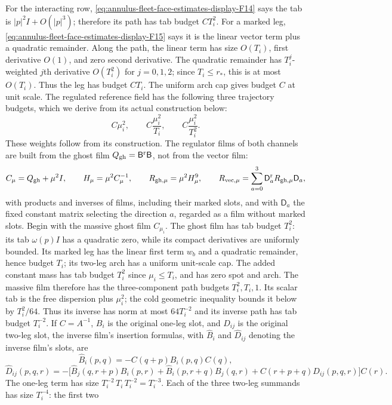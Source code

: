 For the interacting row, \eqref{eq:annulus-fleet-face-estimates-display-F14} says the tab is $|p|^2I+O(|p|^3)$;
therefore its path has tab budget $C T_i^2$. For a marked leg, \eqref{eq:annulus-fleet-face-estimates-display-F15}
says it is the linear vector term plus a quadratic remainder. Along the
path, the linear term has size $O(T_i)$, first derivative $O(1)$, and
zero second derivative. The quadratic remainder has
$T_i^j$-weighted $j$th derivative $O(T_i^2)$ for $j=0,1,2$; since
$T_i\leq r_*$, this is at most $O(T_i)$. Thus the leg has budget
$C T_i$. The
uniform arch cap gives budget $C$ at unit scale. The regulated reference
field has the following three trajectory budgets, which we derive from
its actual construction below:
\[
  C\mu_i^2,\qquad C\frac{\mu_i^2}{T_i},\qquad
  C\frac{\mu_i^2}{T_i^2}.
\]
These weights follow from its construction. The regulator films of
both channels are built from the ghost film
$Q_{\rm gh}=\mathsf B^{\rm r}\mathsf B$, not from the vector film:
\[
 C_\mu=Q_{\rm gh}+\mu^2I,\qquad
 H_\mu=\mu^2C_\mu^{-1},\qquad
 R_{{\rm gh},\mu}=\mu^2H_\mu^{9},\qquad
 R_{{\rm vec},\mu}=\sum_{a=0}^3\mathsf D_a^{\rm r}R_{{\rm gh},\mu}
                    \mathsf D_a,
\]
with products and inverses of films, including their marked slots, and
with $\mathsf D_a$ the fixed constant matrix selecting the direction
$a$, regarded as a film without marked slots. Begin with the massive
ghost film $C_{\mu_i}$. The ghost film has
tab budget $T_i^2$: its tab $\omega(p)I$ has a quadratic zero, while
its compact derivatives are uniformly bounded. Its marked leg has the
linear first term $w_b$ and a quadratic remainder, hence budget $T_i$;
its two-leg arch
has a uniform unit-scale cap. The added constant mass has tab budget
$T_i^2$ since $\mu_i\leq T_i$, and has zero spot and arch. The massive
film therefore has the three-component path budgets $T_i^2,T_i,1$. Its
scalar tab is the free
dispersion plus $\mu_i^2$; the cold geometric inequality bounds it below
by $T_i^2/64$. Thus its inverse has norm at most $64T_i^{-2}$ and its
inverse path has tab budget $T_i^{-2}$. If $C=A^{-1}$, $B_i$ is the
original one-leg slot, and $D_{ij}$ is the original two-leg slot, the
inverse film's insertion formulas, with $\widehat B_i$ and
$\widehat D_{ij}$ denoting the inverse film's slots, are
\[
 \widehat B_i(p,q)=-C(q+p)B_i(p,q)C(q),
\]
\[
 \widehat D_{ij}(p,q,r)=-\bigl[\widehat B_j(q,r+p)B_i(p,r)
       +\widehat B_i(p,r+q)B_j(q,r)
       +C(r+p+q)D_{ij}(p,q,r)\bigr]C(r).
\]
The one-leg term has size $T_i^{-2}\,T_i\,T_i^{-2}=T_i^{-3}$.
Each of the three two-leg summands has size $T_i^{-4}$: the first two
